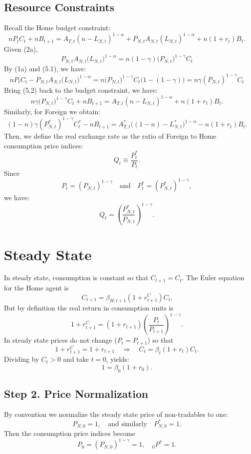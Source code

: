 \documentclass[a4paper,12pt]{article} %
\theoremstyle{nonitalic}
\begin{document}
\subsection*{Resource Constraints}
Recall the Home budget constraint:
\[
n P_t C_t + n B_{t+1} = A_{T,t}(n-L_{N,t})^{1-\alpha} + P_{N,t}A_{N,t}(L_{N,t})^{1-\alpha} + n(1+r_t)B_t.
\]
Given (2a),
\[
P_{N,t} A_{N,t} \bigl(L_{N,t}\bigr)^{1-\alpha} = n (1-\gamma) \bigl(P_{N,t}\bigr)^{1-\gamma} C_t \tag{5.1}
\]
By (1a) and (5.1), we have:
\[
n P_t C_t - P_{N,t} A_{N,t} \bigl(L_{N,t}\bigr)^{1-\alpha} = n \bigl(P_{N,t}\bigr)^{1-\gamma} C_t \bigl(1 - (1-\gamma)\bigr) = n \gamma (P_{N,t})^{1-\gamma} C_t \tag{5.2}
\]
Bring (5.2) back to the budget constraint, we have:
\[
n \gamma \bigl(P_{N,t}\bigr)^{1-\gamma} C_t + n B_{t+1} = A_{T,t}(n-L_{N,t})^{1-\alpha} + n(1+r_t)B_t. \tag{5a} 
\]
Similarly, for Foreign we obtain:
\[
(1-n)\gamma (P^*_{N,t})^{1-\gamma}C^*_t - n B_{t+1} = A^*_{T,t}\big((1-n)-L^*_{N,t}\big)^{1-\alpha} - n(1+r_t)B_t. \tag{5b}
\]
Then, we define the real exchange rate as the ratio of Foreign to Home consumption price indices:
\[
Q_t \equiv \frac{P^*_t}{P_t}.
\]
Since
\[
P_t = (P_{N,t})^{1-\gamma} \quad \text{and} \quad P^*_t = (P^*_{N,t})^{1-\gamma},
\]
we have:
\[
Q_t = \left(\frac{P^*_{N,t}}{P_{N,t}}\right)^{1-\gamma}. \tag{5c}
\]

\section{Steady State}

In steady state, consumption is constant so that $C_{t+1}=C_t$. The Euler equation for the Home agent is
\[
C_{t+1} = \beta_{H,t+1}(1+r_{t+1}^C) C_t. \tag{6.1}
\]
But by definition the real return in consumption units is
\[
1+r_{t+1}^C = (1+r_{t+1})\left(\frac{P_t}{P_{t+1}}\right)^{1-\gamma}. \tag{6.2}
\]
In steady state prices do not change ($P_t=P_{t+1}$) so that
\[
1+r_{t+1}^C = 1+r_{t+1}\quad\Rightarrow\quad C_t = \beta_t(1+r_t)C_t.
\]
Dividing by $C_t>0$ and take $t=0$, yields:
\[
1=\beta_0(1+r_0). \tag{6a}
\]

\subsection*{Step 2. Price Normalization}
By convention we normalize the steady state price of non-tradables to one:
\[
P_{N,0}=1,\quad \text{and similarly}\quad P_{N,0}^*=1.
\]
Then the consumption price indices become
\[
P_0=(P_{N,0})^{1-\gamma}=1,\quad _0P^*=1. \tag{6b}
\]
\end{document}
